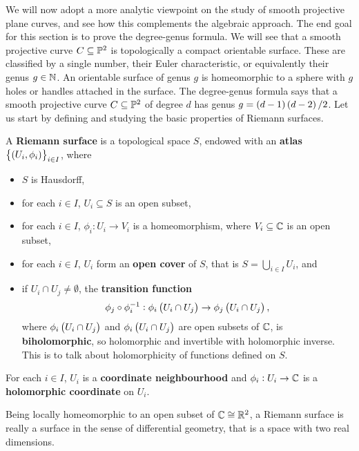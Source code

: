 We will now adopt a more analytic viewpoint on the study of smooth projective plane curves, and see how this complements the algebraic approach. The end goal for this section is to prove the degree-genus formula. We will see that a smooth projective curve $ C \subseteq \mathbb{P}^2 $ is topologically a compact orientable surface. These are classified by a single number, their Euler characteristic, or equivalently their genus $ g \in \mathbb{N} $. An orientable surface of genus $ g $ is homeomorphic to a sphere with $ g $ holes or handles attached in the surface. The degree-genus formula says that a smooth projective curve $ C \subseteq \mathbb{P}^2 $ of degree $ d $ has genus $ g = \br{d - 1}\br{d - 2} / 2 $. Let us start by defining and studying the basic properties of Riemann surfaces.

\begin{definition}
\label{def:15.1}
A \textbf{Riemann surface} is a topological space $ S $, endowed with an \textbf{atlas} $ \cbr{\br{U_i, \phi_i}}_{i \in I} $, where
\begin{itemize}
\item $ S $ is Hausdorff,
\item for each $ i \in I $, $ U_i \subseteq S $ is an open subset,
\item for each $ i \in I $, $ \phi_i : U_i \to V_i $ is a homeomorphism, where $ V_i \subseteq \mathbb{C} $ is an open subset,
\item for each $ i \in I $, $ U_i $ form an \textbf{open cover} of $ S $, that is $ S = \bigcup_{i \in I} U_i $, and
\item if $ U_i \cap U_j \ne \emptyset $, the \textbf{transition function}
$$ \phi_j \circ \phi_i^{-1} : \phi_i\br{U_i \cap U_j} \to \phi_j\br{U_i \cap U_j}, $$
where $ \phi_i\br{U_i \cap U_j} $ and $ \phi_i\br{U_i \cap U_j} $ are open subsets of $ \mathbb{C} $, is \textbf{biholomorphic}, so holomorphic and invertible with holomorphic inverse. This is to talk about holomorphicity of functions defined on $ S $.
\end{itemize}
For each $ i \in I $, $ U_i $ is a \textbf{coordinate neighbourhood} and $ \phi_i : U_i \to \mathbb{C} $ is a \textbf{holomorphic coordinate} on $ U_i $.
\end{definition}

\begin{remark}
Being locally homeomorphic to an open subset of $ \mathbb{C} \cong \mathbb{R}^2 $, a Riemann surface is really a surface in the sense of differential geometry, that is a space with two real dimensions.
\end{remark}

